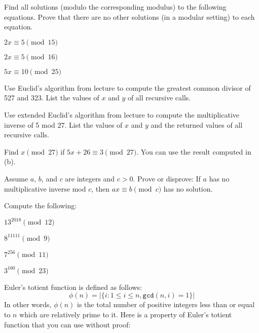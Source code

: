 
Find all solutions (modulo the corresponding modulus) to the following equations.  Prove that there are no other solutions (in a modular setting) to each equation.

\begin{Parts} 
\Part $2x \equiv 5 \pmod{15}$

\Part $2x \equiv 5 \pmod{16}$

\Part $5x \equiv 10 \pmod{25}$

\end{Parts}



\begin{Parts}
    \Part Use Euclid's algorithm from lecture to compute the greatest common divisor of 527 and 323. List the values of $x$ and $y$ of all recursive calls.

    \Part Use extended Euclid's algorithm from lecture to compute the multiplicative inverse of 5 mod 27. List the values of $x$ and $y$ and the returned values of all recursive calls.

    \Part Find $x \pmod{27}$ if $5x + 2 6 \equiv 3 \pmod{27}$. You can use the result computed in (b).

    \Part Assume $a$, $b$, and $c$ are integers and $c>0$. Prove or disprove: If $a$ has no multiplicative inverse mod $c$, then $ax \equiv b \pmod{c}$ has no solution.

\end{Parts}



Compute the following:

\begin{Parts}

\Part $13^{2018} \pmod {12}$
\nosolspace{1.5cm}

\Part $8^{11111} \pmod 9$
\nosolspace{1.5cm}

\Part $7^{256} \pmod {11}$
\nosolspace{1.5cm}

\Part $3^{160} \pmod {23}$
\nosolspace{1.5cm}

\end{Parts}


  Euler's totient function is defined as follows:
  $$\phi(n) = | \{i: 1 \leq i \leq n, \texttt{gcd}(n,i) = 1\} |$$
  In other words, $\phi(n)$ is the total number of positive integers less than or equal to $n$ which are relatively prime to it.
  Here is a property of Euler's totient function that you can use without proof:

